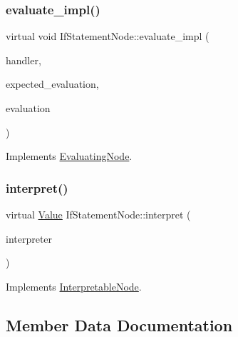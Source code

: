 \subsubsection{\texorpdfstring{evaluate\+\_\+impl()}{evaluate\_impl()}}
{\footnotesize\ttfamily virtual void If\+Statement\+Node\+::evaluate\+\_\+impl (\begin{DoxyParamCaption}\item[{\hyperlink{classSystemHandler}{System\+Handler} $\ast$}]{handler,  }\item[{\hyperlink{statics_8h_a6664c451ca7787483a7981cc1de68dbb}{E\+V\+A\+L\+U\+A\+T\+I\+O\+N\+\_\+\+T\+Y\+PE}}]{expected\+\_\+evaluation,  }\item[{struct \hyperlink{structEvaluation}{Evaluation} $\ast$}]{evaluation }\end{DoxyParamCaption})\hspace{0.3cm}{\ttfamily [virtual]}}



Implements \hyperlink{classEvaluatingNode_a085fa06e0b46a93c814dc55cda0c1b26}{Evaluating\+Node}.

\mbox{\label{classIfStatementNode_aef627f32330e55f8bb9e5ac2f2f5f3f8}} 
\subsubsection{\texorpdfstring{interpret()}{interpret()}}
{\footnotesize\ttfamily virtual \hyperlink{classValue}{Value} If\+Statement\+Node\+::interpret (\begin{DoxyParamCaption}\item[{\hyperlink{classInterpreter}{Interpreter} $\ast$}]{interpreter }\end{DoxyParamCaption})\hspace{0.3cm}{\ttfamily [virtual]}}



Implements \hyperlink{classInterpretableNode_a9a466e7d65c4b323d2b96b4ac8396cd7}{Interpretable\+Node}.



\subsection{Member Data Documentation}
\mbox{\label{classIfStatementNode_a021cd8dd0edd333f98d74cfd1c38acd0}} 
